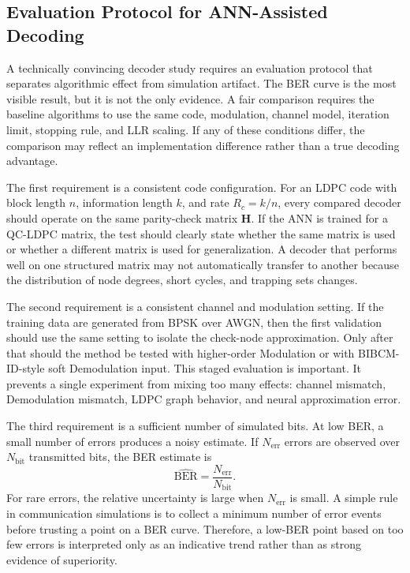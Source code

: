 \subsection{Evaluation Protocol for ANN-Assisted Decoding}
A technically convincing decoder study requires an evaluation protocol that separates algorithmic effect from simulation artifact. The BER curve is the most visible result, but it is not the only evidence. A fair comparison requires the baseline algorithms to use the same code, modulation, channel model, iteration limit, stopping rule, and LLR scaling. If any of these conditions differ, the comparison may reflect an implementation difference rather than a true decoding advantage.

The first requirement is a consistent code configuration. For an LDPC code with block length $n$, information length $k$, and rate $R_c=k/n$, every compared decoder should operate on the same parity-check matrix $\mathbf{H}$. If the ANN is trained for a QC-LDPC matrix, the test should clearly state whether the same matrix is used or whether a different matrix is used for generalization. A decoder that performs well on one structured matrix may not automatically transfer to another because the distribution of node degrees, short cycles, and trapping sets changes.

The second requirement is a consistent channel and modulation setting. If the training data are generated from BPSK over AWGN, then the first validation should use the same setting to isolate the check-node approximation. Only after that should the method be tested with higher-order Modulation or with BIBCM-ID-style soft Demodulation input. This staged evaluation is important. It prevents a single experiment from mixing too many effects: channel mismatch, Demodulation mismatch, LDPC graph behavior, and neural approximation error.

The third requirement is a sufficient number of simulated bits. At low BER, a small number of errors produces a noisy estimate. If $N_{\mathrm{err}}$ errors are observed over $N_{\mathrm{bit}}$ transmitted bits, the BER estimate is
\begin{equation}
  \widehat{\mathrm{BER}}=\frac{N_{\mathrm{err}}}{N_{\mathrm{bit}}}.
\end{equation}
For rare errors, the relative uncertainty is large when $N_{\mathrm{err}}$ is small. A simple rule in communication simulations is to collect a minimum number of error events before trusting a point on a BER curve. Therefore, a low-BER point based on too few errors is interpreted only as an indicative trend rather than as strong evidence of superiority.


